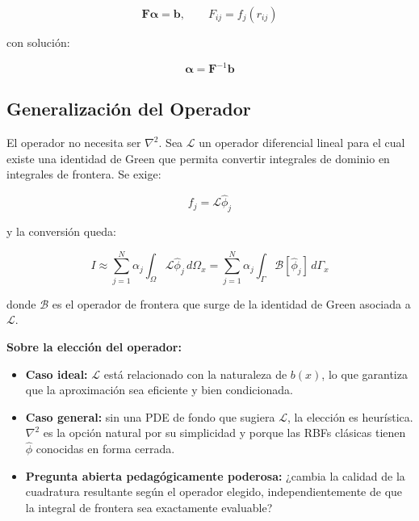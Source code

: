 \documentclass[12pt,a4paper]{article}
\begin{document}
\begin{equation}
    \mathbf{F}\boldsymbol{\alpha} = \mathbf{b}, \qquad F_{ij} = f_j(r_{ij})
\end{equation}

con solución:

\begin{equation}
    \boldsymbol{\alpha} = \mathbf{F}^{-1}\mathbf{b}
\end{equation}

\subsection{Generalización del Operador}

El operador no necesita ser $\nabla^2$. Sea $\mathcal{L}$ un operador
diferencial lineal para el cual existe una identidad de Green que permita
convertir integrales de dominio en integrales de frontera. Se exige:

\begin{equation}
    f_j = \mathcal{L}\hat{\phi}_j
\end{equation}

y la conversión queda:

\begin{equation}
    I \approx \sum_{j=1}^{N} \alpha_j \int_\Omega \mathcal{L}\hat{\phi}_j\,
    d\Omega_x = \sum_{j=1}^{N} \alpha_j \int_\Gamma
    \mathcal{B}[\hat{\phi}_j]\, d\Gamma_x
\end{equation}

donde $\mathcal{B}$ es el operador de frontera que surge de la identidad de
Green asociada a $\mathcal{L}$.

\textbf{Sobre la elección del operador:}
\begin{itemize}
    \item \textbf{Caso ideal:} $\mathcal{L}$ está relacionado con la naturaleza
    de $b(x)$, lo que garantiza que la aproximación sea eficiente y bien
    condicionada.
    \item \textbf{Caso general:} sin una PDE de fondo que sugiera $\mathcal{L}$,
    la elección es heurística. $\nabla^2$ es la opción natural por su
    simplicidad y porque las RBFs clásicas tienen $\hat{\phi}$ conocidas en
    forma cerrada.
    \item \textbf{Pregunta abierta pedagógicamente poderosa:} ¿cambia la
    calidad de la cuadratura resultante según el operador elegido,
    independientemente de que la integral de frontera sea exactamente evaluable?
\end{itemize}
\end{document}
